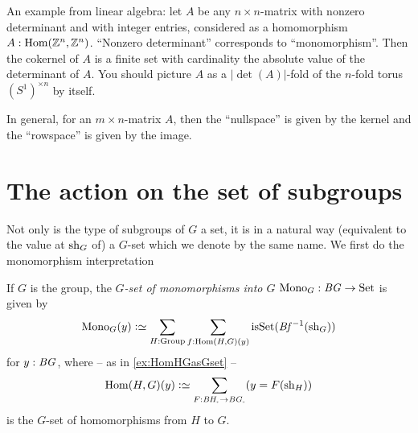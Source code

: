 
\begin{example}
  An example from linear algebra: let $A$ be any $n\times n$-matrix with nonzero determinant and with integer entries, considered as a homomorphism $A:\Hom(\ZZ^n,\ZZ^n)$. ``Nonzero determinant'' corresponds to ``monomorphism''.  Then the cokernel of $A$ is a finite set with cardinality the absolute value of the determinant of $A$.  You should picture $A$ as a $|\det(A)|$-fold \covering of the $n$-fold torus $(S^1)^{\times n}$ by itself.

  In general, for an $m\times n$-matrix $A$, then the ``nullspace'' is given by the kernel and the ``rowspace'' is given by the image.
\end{example}


      \section{The action on the set of subgroups}
\label{sec:actiononsub}

Not only is the type of subgroups  of $G$ a set, it is in a natural way (equivalent to the value at $\mathrm{sh}_G$ of) a $G$-set which we denote by the same name.  We first do the monomorphism interpretation
\begin{definition}
  If $G$ is the group, the \emph{$G$-set of monomorphisms into $G$} $\mathrm{Mono}_G:\mathit{B}\mathit{G}\to\mathrm{Set}$ is given by
  $$%
  \typemono_G(y)\defequi \sum_{H:\typegroup}\sum_{f:\Hom(H,G)(y)}\isset(\Bf^{-1}(\sh_G))$$
  for $y:\mathit{B}\mathit{G}$,
where  -- as in \cref{ex:HomHGasGset} --
$$\Hom(H,G)(y)\defequi\sum_{F:\BH_\div\to \BG_\div}(y=F(\sh_H))$$
is the $G$-set of homomorphisms from $H$ to $G$.
\end{definition}

